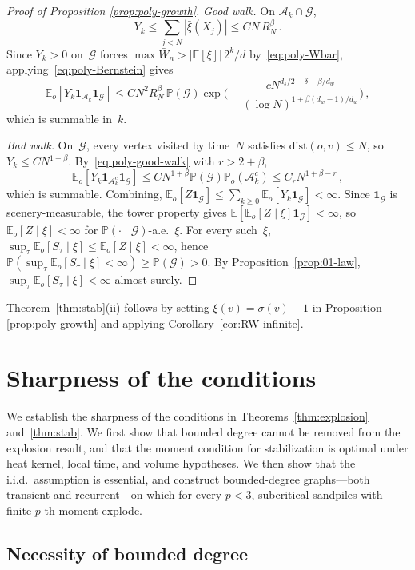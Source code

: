 \documentclass[aop]{imsart}
\theoremstyle{plain}
\theoremstyle{definition}
\newcommand{\E}{\mathbb{E}}
\renewcommand{\P}{\mathbb{P}}
\newcommand{\one}{\mathbf{1}}
\begin{document}
\begin{proof}[Proof of Proposition \ref{prop:poly-growth}]
		\emph{Good walk.}  On $\mathcal{A}_k\cap\mathcal{G}$,
		\[
		Y_k\leq\sum_{j<N}|\bar\xi(X_j)|\leq CN\,R_N^{\beta}\,.
		\]
		Since $Y_k>0$ on~$\mathcal{G}$ forces $\max\bar W_n>|\E[\xi]|\,2^k/d$ by~\eqref{eq:poly-Wbar}, applying~\eqref{eq:poly-Bernstein} gives
		\[
		\E_o[Y_k\one_{\mathcal{A}_k}\one_\mathcal{G}]
		\leq CN^2 R_N^{\beta}\,\P(\mathcal{G})\exp\biggl(-\frac{cN^{d_s/2-\delta-\beta/d_w}}{(\log N)^{1+\beta(d_w-1)/d_w}}\biggr)\,,
		\]
		which is summable in~$k$.
		
		\emph{Bad walk.}  On~$\mathcal{G}$, every vertex visited by time~$N$ satisfies $\mathrm{dist}(o,v)\leq N$, so $Y_k\leq CN^{1+\beta}$.  By~\eqref{eq:poly-good-walk} with $r>2+\beta$,
		\[
		\E_o[Y_k\one_{\mathcal{A}_k^c}\one_\mathcal{G}]
		\leq CN^{1+\beta}\P(\mathcal{G})\P_o(\mathcal{A}_k^c)
		\leq C_r N^{1+\beta-r}\,,
		\]
		which is summable.  Combining, $\E_o[Z\one_\mathcal{G}] \leq \sum_{k\geq 0}\E_o[Y_k\one_\mathcal{G}] < \infty$. Since $\one_\mathcal{G}$ is scenery-measurable, the tower property gives $\E[\E_o[Z\mid\xi]\one_\mathcal{G}]<\infty$, so $\E_o[Z\mid\xi]<\infty$ for $\P(\cdot\mid\mathcal{G})$-a.e.~$\xi$.  For every such~$\xi$, $\sup_\tau\E_o[S_\tau\mid\xi]\leq\E_o[Z\mid\xi]<\infty$, hence $\P(\sup_\tau\E_o[S_\tau\mid\xi]<\infty)\geq\P(\mathcal{G})>0$.  By Proposition~\ref{prop:01-law}, $\sup_\tau\E_o[S_\tau\mid\xi]<\infty$ almost surely.
	\end{proof}
	
	Theorem~\ref{thm:stab}(ii) follows by setting $\xi(v)=\sigma(v)-1$ in Proposition \ref{prop:poly-growth} and applying Corollary~\ref{cor:RW-infinite}.
	
	
	
	\section{Sharpness of the conditions}\label{sec:counterexamples}
	
	We establish the sharpness of the conditions in Theorems~\ref{thm:explosion} and~\ref{thm:stab}. We first show that bounded degree cannot be removed from the explosion result, and that the moment condition for stabilization is optimal under heat kernel, local time, and volume hypotheses. We then show that the i.i.d.\ assumption is essential, and construct bounded-degree graphs---both transient and recurrent---on which for every $p<3$, subcritical sandpiles with finite $p$-th moment explode.
	
	\subsection{Necessity of bounded degree}
	
\end{document}
